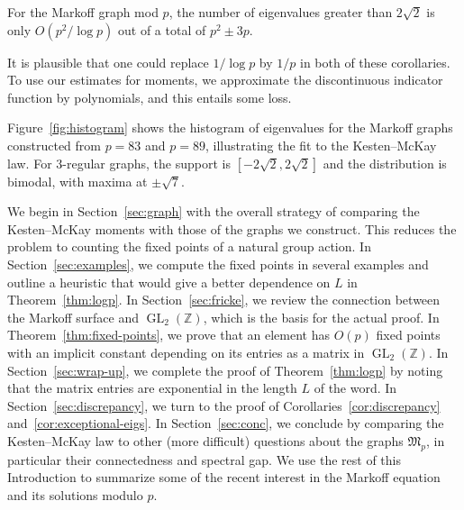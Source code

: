 \documentclass[10pt]{amsart}
\theoremstyle{definition}\newtheorem{defi}[theo]{Definition}\newtheorem{rema}[theo]{Remark}\newtheorem{exam}[theo]{Example}\newtheorem{exem}[theo]{Example}\newtheorem{nota}[theo]{Notation}
\newcommand{\Z}{\mathbb{Z}}
\DeclareMathOperator{\GL}{GL}
\begin{document}
\begin{coro}\label{cor:exceptional-eigs}
For the Markoff graph mod $p$, the number of eigenvalues greater than $2\sqrt{2}$ is only $O(p^2/\log{p})$ out of a total of $p^2 \pm 3p$.
\end{coro}

It is plausible that one could replace $1/\log{p}$ by $1/p$ in both of these corollaries. To use our estimates for moments, we approximate the discontinuous indicator function by polynomials, and this entails some loss.

Figure~\ref{fig:histogram} shows the histogram of eigenvalues for the Markoff graphs constructed from $p=83$ and $p=89$, illustrating the fit to the Kesten--McKay law. For $3$-regular graphs, the support is $[-2\sqrt{2}, 2\sqrt{2}]$ and the distribution is bimodal, with maxima at $\pm \sqrt{7}$.

We begin in Section~\ref{sec:graph} with the overall strategy of comparing the Kesten--McKay moments with those of the graphs we construct. This reduces the problem to counting the fixed points of a natural group action. In Section~\ref{sec:examples}, we compute the fixed points in several examples and outline a heuristic that would give a better dependence on $L$ in Theorem~\ref{thm:logp}. In Section~\ref{sec:fricke}, we review the connection between the Markoff surface and $\GL_2(\Z)$, which is the basis for the actual proof. In Theorem~\ref{thm:fixed-points}, we prove that an element has $O(p)$ fixed points with an implicit constant depending on its entries as a matrix in $\GL_2(\Z)$. In Section~\ref{sec:wrap-up}, we complete the proof of Theorem~\ref{thm:logp} by noting that the matrix entries are exponential in the length $L$ of the word. In Section~\ref{sec:discrepancy}, we turn to the proof of Corollaries~\ref{cor:discrepancy} and~\ref{cor:exceptional-eigs}. In Section~\ref{sec:conc}, we conclude by comparing the Kesten--McKay law to other (more difficult) questions about the graphs $\mathfrak{M}_p$, in particular their connectedness and spectral gap. We use the rest of this Introduction to summarize some of the recent interest in the Markoff equation and its solutions modulo $p$.
\end{document}
